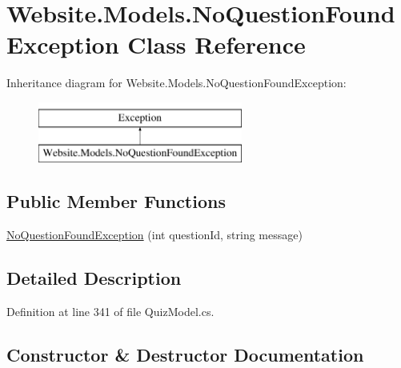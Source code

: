 \hypertarget{class_website_1_1_models_1_1_no_question_found_exception}{}\section{Website.\+Models.\+No\+Question\+Found\+Exception Class Reference}
\label{class_website_1_1_models_1_1_no_question_found_exception}
Inheritance diagram for Website.\+Models.\+No\+Question\+Found\+Exception\+:\begin{figure}[H]
\begin{center}
\leavevmode
\includegraphics[height=2.000000cm]{class_website_1_1_models_1_1_no_question_found_exception}
\end{center}
\end{figure}
\subsection*{Public Member Functions}
\begin{DoxyCompactItemize}
\item 
\hyperlink{class_website_1_1_models_1_1_no_question_found_exception_ab202db24badf6ce4f12388d7f99873f5}{No\+Question\+Found\+Exception} (int question\+Id, string message)
\end{DoxyCompactItemize}


\subsection{Detailed Description}


Definition at line 341 of file Quiz\+Model.\+cs.



\subsection{Constructor \& Destructor Documentation}
\hypertarget{class_website_1_1_models_1_1_no_question_found_exception_ab202db24badf6ce4f12388d7f99873f5}{}
